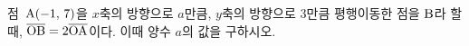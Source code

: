 점~$\mathrm{A}(-1,\,7)$을 $x$축의 방향으로 $a$만큼, $y$축의 방향으로 $3$만큼 평행이동한 점을 $\mathrm{B}$라 할 때, $\overline{\mathrm{OB}}=2\overline{\mathrm{OA}}$이다. 이때 양수 $a$의 값을 구하시오. 
